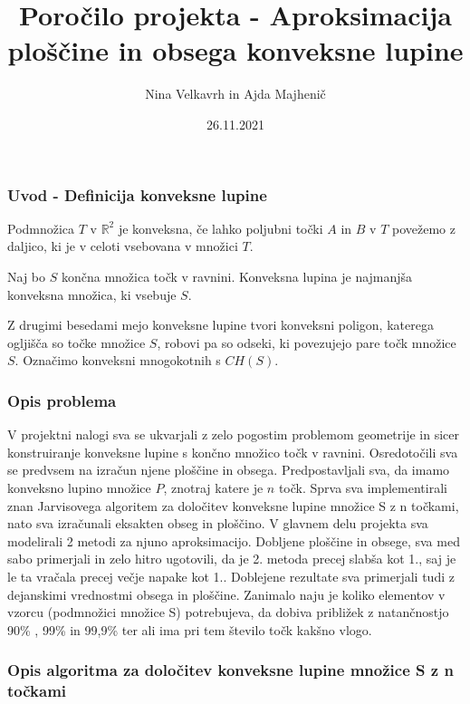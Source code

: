\documentclass[
]{article}
\title{Poročilo projekta - Aproksimacija ploščine in obsega konveksne
lupine}
\author{Nina Velkavrh in Ajda Majhenič}
\date{26.11.2021}
\begin{document}
\maketitle

\hypertarget{uvod---definicija-konveksne-lupine}{%
\subsubsection{Uvod - Definicija konveksne
lupine}\label{uvod---definicija-konveksne-lupine}}

Podmnožica \(T\) v \(\mathbb{R}^2\) je konveksna, če lahko poljubni
točki \(A\) in \(B\) v \(T\) povežemo z daljico, ki je v celoti
vsebovana v množici \(T\).

Naj bo \(S\) končna množica točk v ravnini. Konveksna lupina je
najmanjša konveksna množica, ki vsebuje \(S\).

Z drugimi besedami mejo konveksne lupine tvori konveksni poligon,
katerega ogljišča so točke množice \(S\), robovi pa so odseki, ki
povezujejo pare točk množice \(S\). Označimo konveksni mnogokotnih s
\(CH(S)\).

\hypertarget{opis-problema}{%
\subsubsection{Opis problema}\label{opis-problema}}

V projektni nalogi sva se ukvarjali z zelo pogostim problemom geometrije
in sicer konstruiranje konveksne lupine s končno množico točk v ravnini.
Osredotočili sva se predvsem na izračun njene ploščine in obsega.
Predpostavljali sva, da imamo konveksno lupino množice \(P\), znotraj
katere je \(n\) točk. Sprva sva implementirali znan Jarvisovega
algoritem za določitev konveksne lupine množice S z n točkami, nato sva
izračunali eksakten obseg in ploščino. V glavnem delu projekta sva
modelirali 2 metodi za njuno aproksimacijo. Dobljene ploščine in obsege,
sva med sabo primerjali in zelo hitro ugotovili, da je 2. metoda precej
slabša kot 1., saj je le ta vračala precej večje napake kot 1..
Doblejene rezultate sva primerjali tudi z dejanskimi vrednostmi obsega
in ploščine. Zanimalo naju je koliko elementov v vzorcu (podmnožici
množice S) potrebujeva, da dobiva približek z natančnostjo 90\% , 99\%
in 99,9\% ter ali ima pri tem število točk kakšno vlogo.

\hypertarget{opis-algoritma-za-doloux10ditev-konveksne-lupine-mnoux17eice-s-z-n-toux10dkami}{%
\subsubsection{Opis algoritma za določitev konveksne lupine množice S z
n
točkami}\label{opis-algoritma-za-doloux10ditev-konveksne-lupine-mnoux17eice-s-z-n-toux10dkami}}
\end{document}
